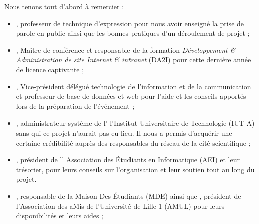 Nous tenons tout d'abord à remercier :

\begin{itemize}

\item {}, professeur de technique d'expression pour nous
avoir enseigné la prise de parole en public ainsi que les bonnes
pratiques d'un déroulement de projet ;

\item {}, Maître de conférence et responsable de la
formation \emph{Développement \& Administration de site Internet \&
intranet} (DA2I) pour cette dernière année de licence captivante ;

\item {}, Vice-président délégué technologie de
l'information et de la communication et professeur de base de données et
web pour l'aide et les conseils apportés lors de la préparation de
l'événement ;

\item {}, administrateur système de l' \og l'Institut
Universitaire de Technologie \fg{} (IUT A) sans qui ce projet n'aurait pas
eu lieu. Il nous a permis d'acquérir une certaine crédibilité auprès des
responsables du réseau de la cité scientifique ;

\item {}, président de l' \og Association des Étudiants en
Informatique \fg{} (AEI) et leur trésorier,  pour
leurs conseils sur l'organisation et leur soutien tout au long du
projet.

\item {}, responsable de la \og Maison Des Étudiants \fg{}
(MDE) ainsi que , président de l'\og Association des aMis
de l'Université de Lille 1 \fg{} (AMUL) pour leurs disponibilités et
leurs aides ;

\end{itemize}
